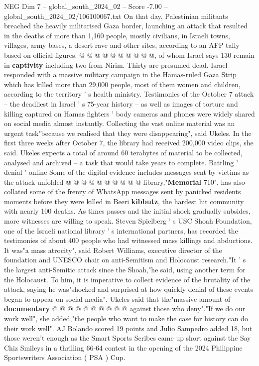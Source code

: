 \begin{textsample}{NEG Dim 7 – global\_south\_2024\_02 – Score -7.00 – global\_south\_2024\_02/106100067.txt}
On that day, Palestinian militants breached the heavily militarised Gaza border, launching an attack that resulted in the deaths of more than 1,160 people, mostly civilians, in Israeli towns, villages, army bases, a desert rave and other sites, according to an AFP tally based on official figures. @ @ @ @ @ @ @ @ @ @, of whom Israel says 130 remain in \textbf{captivity} including two from Nirim.
Thirty are presumed dead.
Israel responded with a massive military campaign in the Hamas-ruled Gaza Strip which has killed more than 29,000 people, most of them women and children, according to the territory ' s health ministry.
Testimonies of the October 7 attack -- the deadliest in Israel ' s 75-year history -- as well as images of torture and killing captured on Hamas fighters ' body cameras and phones were widely shared on social media almost instantly.
Collecting the vast online material was an urgent task"because we realised that they were disappearing", said Ukeles.
In the first three weeks after October 7, the library had received 200,000 video clips, she said.
Ukeles expects a total of around 60 terabytes of material to be collected, analysed and archived -- a task that would take years to complete.
Battling ' denial ' online Some of the digital evidence includes messages sent by victims as the attack unfolded @ @ @ @ @ @ @ @ @ @ library,"\textbf{Memorial} 710", has also collated some of the frenzy of WhatsApp messages sent by panicked residents moments before they were killed in Beeri \textbf{kibbutz}, the hardest hit community with nearly 100 deaths.
As times passes and the initial shock gradually subsides, more witnesses are willing to speak.
Steven Spielberg ' s USC Shoah Foundation, one of the Israeli national library ' s international partners, has recorded the testimonies of about 400 people who had witnessed mass killings and abductions.
It was"a mass atrocity", said Robert Williams, executive director of the foundation and UNESCO chair on anti-Semitism and Holocaust research."It ' s the largest anti-Semitic attack since the Shoah,"he said, using another term for the Holocaust.
To him, it is imperative to collect evidence of the brutality of the attack, saying he was"shocked and surprised at how quickly denial of these events began to appear on social media".
Ukeles said that the"massive amount of \textbf{documentary} @ @ @ @ @ @ @ @ @ @ against those who deny"."If we do our work well", she added,"the people who want to make the case for history can do their work well".
AJ Bolando scored 19 points and Julio Sampedro added 18, but those weren't enough as the Smart Sports Scribes came up short against the Say Chiz Smileys in a thrilling 66-64 contest in the opening of the 2024 Philippine Sportswriters Association ( PSA ) Cup.

\end{textsample}
